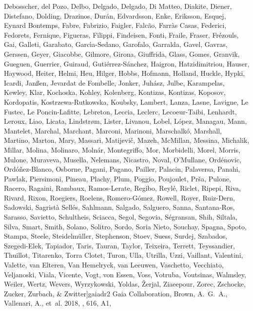 \documentclass[twocolumn]{aastex631}
\begin{document}
\begin{thebibliography}{}
{  {Debosscher}, {del Pozo}, {Delbo}, {Delgado}, {Delgado}, {Di Matteo},
  {Diakite}, {Diener}, {Distefano}, {Dolding}, {Drazinos}, {Dur{\'a}n},
  {Edvardsson}, {Enke}, {Eriksson}, {Esquej}, {Eynard Bontemps}, {Fabre},
  {Fabrizio}, {Faigler}, {Falc{\~a}o}, {Farr{\`a}s Casas}, {Federici},
  {Fedorets}, {Fernique}, {Figueras}, {Filippi}, {Findeisen}, {Fonti},
  {Fraile}, {Fraser}, {Fr{\'e}zouls}, {Gai}, {Galleti}, {Garabato},
  {Garc{\'\i}a-Sedano}, {Garofalo}, {Garralda}, {Gavel}, {Gavras}, {Gerssen},
  {Geyer}, {Giacobbe}, {Gilmore}, {Girona}, {Giuffrida}, {Glass}, {Gomes},
  {Granvik}, {Gueguen}, {Guerrier}, {Guiraud}, {Guti{\'e}rrez-S{\'a}nchez},
  {Haigron}, {Hatzidimitriou}, {Hauser}, {Haywood}, {Heiter}, {Helmi}, {Heu},
  {Hilger}, {Hobbs}, {Hofmann}, {Holland}, {Huckle}, {Hypki}, {Icardi},
  {Jan{\ss}en}, {Jevardat de Fombelle}, {Jonker}, {Juh{\'a}sz}, {Julbe},
  {Karampelas}, {Kewley}, {Klar}, {Kochoska}, {Kohley}, {Kolenberg},
  {Kontizas}, {Kontizas}, {Koposov}, {Kordopatis}, {Kostrzewa-Rutkowska},
  {Koubsky}, {Lambert}, {Lanza}, {Lasne}, {Lavigne}, {Le Fustec}, {Le
  Poncin-Lafitte}, {Lebreton}, {Leccia}, {Leclerc}, {Lecoeur-Taibi},
  {Lenhardt}, {Leroux}, {Liao}, {Licata}, {Lindstr{\o}m}, {Lister}, {Livanou},
  {Lobel}, {L{\'o}pez}, {Managau}, {Mann}, {Mantelet}, {Marchal}, {Marchant},
  {Marconi}, {Marinoni}, {Marschalk{\'o}}, {Marshall}, {Martino}, {Marton},
  {Mary}, {Massari}, {Matijevi{\v{c}}}, {Mazeh}, {McMillan}, {Messina},
  {Michalik}, {Millar}, {Molina}, {Molinaro}, {Moln{\'a}r}, {Montegriffo},
  {Mor}, {Morbidelli}, {Morel}, {Morris}, {Mulone}, {Muraveva}, {Musella},
  {Nelemans}, {Nicastro}, {Noval}, {O'Mullane}, {Ord{\'e}novic},
  {Ord{\'o}{\~n}ez-Blanco}, {Osborne}, {Pagani}, {Pagano}, {Pailler},
  {Palacin}, {Palaversa}, {Panahi}, {Pawlak}, {Piersimoni}, {Pineau}, {Plachy},
  {Plum}, {Poggio}, {Poujoulet}, {Pr{\v{s}}a}, {Pulone}, {Racero}, {Ragaini},
  {Rambaux}, {Ramos-Lerate}, {Regibo}, {Reyl{\'e}}, {Riclet}, {Ripepi}, {Riva},
  {Rivard}, {Rixon}, {Roegiers}, {Roelens}, {Romero-G{\'o}mez}, {Rowell},
  {Royer}, {Ruiz-Dern}, {Sadowski}, {Sagrist{\`a} Sell{\'e}s}, {Sahlmann},
  {Salgado}, {Salguero}, {Sanna}, {Santana-Ros}, {Sarasso}, {Savietto},
  {Schultheis}, {Sciacca}, {Segol}, {Segovia}, {S{\'e}gransan}, {Shih},
  {Siltala}, {Silva}, {Smart}, {Smith}, {Solano}, {Solitro}, {Sordo}, {Soria
  Nieto}, {Souchay}, {Spagna}, {Spoto}, {Stampa}, {Steele},
  {Steidelm{\"u}ller}, {Stephenson}, {Stoev}, {Suess}, {Surdej}, {Szabados},
  {Szegedi-Elek}, {Tapiador}, {Taris}, {Tauran}, {Taylor}, {Teixeira},
  {Terrett}, {Teyssandier}, {Thuillot}, {Titarenko}, {Torra Clotet}, {Turon},
  {Ulla}, {Utrilla}, {Uzzi}, {Vaillant}, {Valentini}, {Valette}, {van Elteren},
  {Van Hemelryck}, {van Leeuwen}, {Vaschetto}, {Vecchiato}, {Veljanoski},
  {Viala}, {Vicente}, {Vogt}, {von Essen}, {Voss}, {Votruba}, {Voutsinas},
  {Walmsley}, {Weiler}, {Wertz}, {Wevers}, {Wyrzykowski}, {Yoldas},
  {{\v{Z}}erjal}, {Ziaeepour}, {Zorec}, {Zschocke}, {Zucker}, {Zurbach}, \&
  {Zwitter}}]{gaiadr2}
{Gaia Collaboration}, {Brown}, A.~G.~A., {Vallenari}, A., {et~al.} 2018, \aap,
  616, A1, 


\end{thebibliography}
\end{document}
